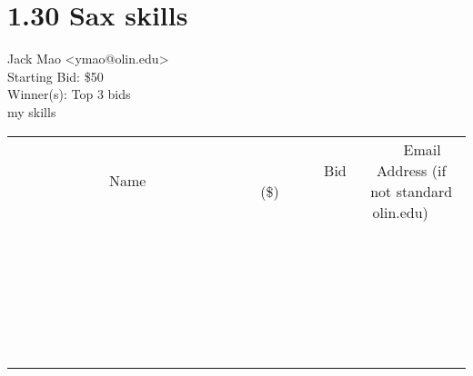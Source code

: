 \documentclass[11pt]{article}
\begin{document}
					\section*{1.30 Sax skills}
					Jack Mao <ymao@olin.edu> \\
					Starting Bid: \$50 \\
					Winner(s): Top 3 bids \\
					my skills \\
					[6ex]
					\begin{tabular}{c c c}
						~~~~~~~~~~~~~Name~~~~~~~~~~~~~ & ~~~~~~~~~Bid (\$)~~~~~~~~~ & ~~~Email Address (if not standard olin.edu)~~~ \\
				
 & & \\
\hline
 & & \\
\hline
 & & \\
\hline
 & & \\
\hline
 & & \\
\hline
 & & \\
\hline
 & & \\
\hline
 & & \\
\hline
 & & \\
\hline
 & & \\
\hline
 & & \\
\hline
 & & \\
\hline
 & & \\
\hline
 & & \\
\hline
 & & \\
\hline
 & & \\
\hline
 & & \\
\hline
 & & \\
\hline
 & & \\
\hline
 & & \\
\hline
 & & \\
\hline
 & & \\
\hline
 & & \\
\hline
 & & \\
\hline
 & & \\
\hline
 & & \\
\hline
					\end{tabular}
					\clearpage
				
\end{document}
